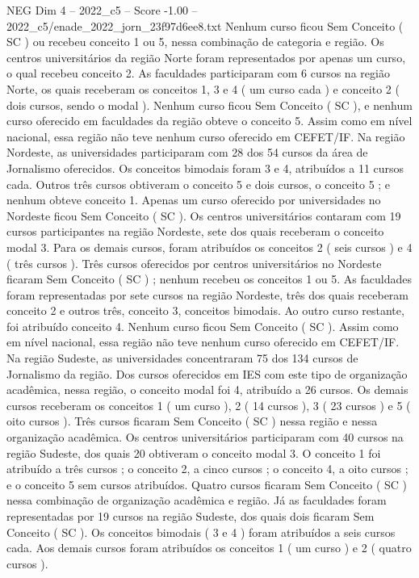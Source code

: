 \begin{textsample}{NEG Dim 4 – 2022\_c5 – Score -1.00 – 2022\_c5/enade\_2022\_jorn\_23f97d6ee8.txt}
Nenhum curso ficou Sem Conceito ( SC ) ou recebeu conceito 1 ou 5, nessa combinação de categoria e região.
Os centros universitários da região Norte foram representados por apenas um curso, o qual recebeu conceito 2.
As faculdades participaram com 6 cursos na região Norte, os quais receberam os conceitos 1, 3 e 4 ( um curso cada ) e conceito 2 ( dois cursos, sendo o modal ).
Nenhum curso ficou Sem Conceito ( SC ), e nenhum curso oferecido em faculdades da região obteve o conceito 5.
Assim como em nível nacional, essa região não teve nenhum curso oferecido em CEFET/IF.
Na região Nordeste, as universidades participaram com 28 dos 54 cursos da área de Jornalismo oferecidos.
Os conceitos bimodais foram 3 e 4, atribuídos a 11 cursos cada.
Outros três cursos obtiveram o conceito 5 e dois cursos, o conceito 5 ; e nenhum obteve conceito 1.
Apenas um curso oferecido por universidades no Nordeste ficou Sem Conceito ( SC ).
Os centros universitários contaram com 19 cursos participantes na região Nordeste, sete dos quais receberam o conceito modal 3.
Para os demais cursos, foram atribuídos os conceitos 2 ( seis cursos ) e 4 ( três cursos ).
Três cursos oferecidos por centros universitários no Nordeste ficaram Sem Conceito ( SC ) ; nenhum recebeu os conceitos 1 ou 5.
As faculdades foram representadas por sete cursos na região Nordeste, três dos quais receberam conceito 2 e outros três, conceito 3, conceitos bimodais.
Ao outro curso restante, foi atribuído conceito 4.
Nenhum curso ficou Sem Conceito ( SC ).
Assim como em nível nacional, essa região não teve nenhum curso oferecido em CEFET/IF.
Na região Sudeste, as universidades concentraram 75 dos 134 cursos de Jornalismo da região.
Dos cursos oferecidos em IES com este tipo de organização acadêmica, nessa região, o conceito modal foi 4, atribuído a 26 cursos.
Os demais cursos receberam os conceitos 1 ( um curso ), 2 ( 14 cursos ), 3 ( 23 cursos ) e 5 ( oito cursos ).
Três cursos ficaram Sem Conceito ( SC ) nessa região e nessa organização acadêmica.
Os centros universitários participaram com 40 cursos na região Sudeste, dos quais 20 obtiveram o conceito modal 3.
O conceito 1 foi atribuído a três cursos ; o conceito 2, a cinco cursos ; o conceito 4, a oito cursos ; e o conceito 5 sem cursos atribuídos.
Quatro cursos ficaram Sem Conceito ( SC ) nessa combinação de organização acadêmica e região.
Já as faculdades foram representadas por 19 cursos na região Sudeste, dos quais dois ficaram Sem Conceito ( SC ).
Os conceitos bimodais ( 3 e 4 ) foram atribuídos a seis cursos cada.
Aos demais cursos foram atribuídos os conceitos 1 ( um curso ) e 2 ( quatro cursos ).

\end{textsample}
